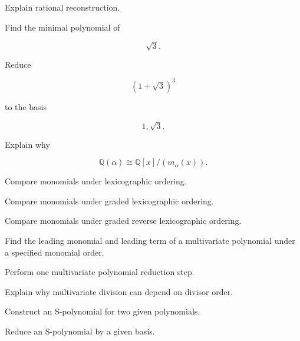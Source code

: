 \begin{exercise}[3]
Explain rational reconstruction.
\end{exercise}

\begin{exercise}[2]
Find the minimal polynomial of

\[
\sqrt{3}.
\]
\end{exercise}

\begin{exercise}[3]
Reduce

\[
(1+\sqrt{3})^3
\]

to the basis

\[
1,\sqrt{3}.
\]
\end{exercise}

\begin{exercise}[3]
Explain why

\[
\mathbb{Q}(\alpha)
\cong
\mathbb{Q}[x]/(m_\alpha(x)).
\]
\end{exercise}

\begin{exercise}[2]
Compare monomials under lexicographic ordering.
\end{exercise}

\begin{exercise}[2]
Compare monomials under graded lexicographic ordering.
\end{exercise}

\begin{exercise}[2]
Compare monomials under graded reverse lexicographic ordering.
\end{exercise}

\begin{exercise}[3]
Find the leading monomial and leading term of a multivariate polynomial
under a specified monomial order.
\end{exercise}

\begin{exercise}[3]
Perform one multivariate polynomial reduction step.
\end{exercise}

\begin{exercise}[3]
Explain why multivariate division can depend on divisor order.
\end{exercise}

\begin{exercise}[3]
Construct an S-polynomial for two given polynomials.
\end{exercise}

\begin{exercise}[3]
Reduce an S-polynomial by a given basis.
\end{exercise}

